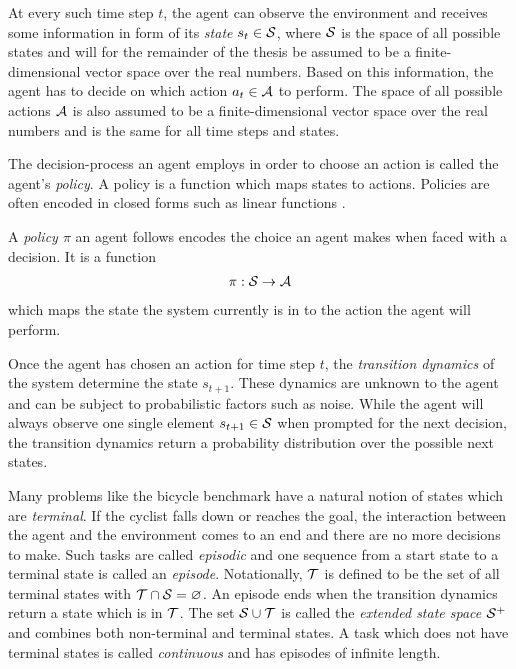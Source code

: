 At every such time step $t$, the agent can observe the environment and receives some information in form of its \emph{state} $s_t \in \mathcal{S}$, where $\mathcal{S}$ is the space of all possible states and will for the remainder of the thesis be assumed to be a finite-dimensional vector space over the real numbers.
Based on this information, the agent has to decide on which action $a_t \in \mathcal{A}$ to perform.
The space of all possible actions $\mathcal{A}$ is also assumed to be a finite-dimensional vector space over the real numbers and is the same for all time steps and states.

The decision-process an agent employs in order to choose an action is called the agent's \emph{policy}.
A policy is a function which maps states to actions.
Policies are often encoded in closed forms such as linear functions \cite{deisenroth_efficient_2010}.
\begin{definition}[Policy]
    A \emph{policy $\pi$} an agent follows encodes the choice an agent makes when faced with a decision.
    It is a function
    \begin{align}
        \pi : \Es \to \Ah
    \end{align}
    which maps the state the system currently is in to the action the agent will perform.
\end{definition}

Once the agent has chosen an action for time step $t$, the \emph{transition dynamics} of the system determine the state $s_{t+1}$.
These dynamics are unknown to the agent and can be subject to probabilistic factors such as noise.
While the agent will always observe one single element $s_{t+1} \in \mathcal{S}$ when prompted for the next decision, the transition dynamics return a probability distribution over the possible next states.

Many problems like the bicycle benchmark have a natural notion of states which are \emph{terminal}.
If the cyclist falls down or reaches the goal, the interaction between the agent and the environment comes to an end and there are no more decisions to make.
Such tasks are called \emph{episodic} and one sequence from a start state to a terminal state is called an \emph{episode}.
Notationally, $\mathcal{T}$ is defined to be the set of all terminal states with $\mathcal{T} \cap \mathcal{S} = \varnothing$.
An episode ends when the transition dynamics return a state which is in $\mathcal{T}$.
The set $\mathcal{S} \cup \mathcal{T}$ is called the \emph{extended state space $\mathcal{S}^+$} and combines both non-terminal and terminal states.
A task which does not have terminal states is called \emph{continuous} and has episodes of infinite length.

